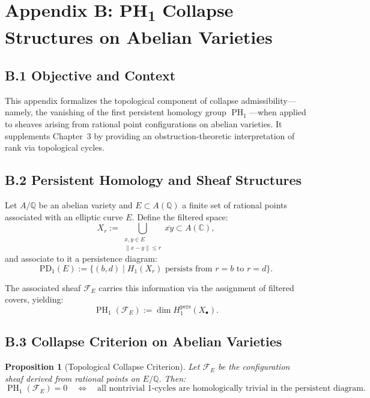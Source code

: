 \documentclass[11pt]{article}
\newtheorem{proposition}[theorem]{Proposition}
\DeclareMathOperator{\PH}{PH}
\begin{document}
\section*{Appendix B: PH\textsubscript{1} Collapse Structures on Abelian Varieties}

\subsection*{B.1 Objective and Context}

This appendix formalizes the topological component of collapse admissibility—namely, the vanishing of the first persistent homology group \( \PH_1 \)—when applied to sheaves arising from rational point configurations on abelian varieties. It supplements Chapter~3 by providing an obstruction-theoretic interpretation of rank via topological cycles.

\subsection*{B.2 Persistent Homology and Sheaf Structures}

Let \( A/\mathbb{Q} \) be an abelian variety and \( E \subset A(\mathbb{Q}) \) a finite set of rational points associated with an elliptic curve \( E \). Define the filtered space:
\[
X_r := \bigcup_{\substack{x,y \in E \\ \|x - y\| \leq r}} \overline{xy} \subset A(\mathbb{C}),
\]
and associate to it a persistence diagram:
\[
\mathrm{PD}_1(E) := \{ (b,d) \mid H_1(X_r) \text{ persists from } r = b \text{ to } r = d \}.
\]

The associated sheaf \( \mathcal{F}_E \) carries this information via the assignment of filtered covers, yielding:
\[
\PH_1(\mathcal{F}_E) := \dim H_1^{\mathrm{pers}}(X_\bullet).
\]

\subsection*{B.3 Collapse Criterion on Abelian Varieties}

\begin{proposition}[Topological Collapse Criterion]
\label{prop:ph1-collapse}
Let \( \mathcal{F}_E \) be the configuration sheaf derived from rational points on \( E/\mathbb{Q} \). Then:
\[
\PH_1(\mathcal{F}_E) = 0 \quad \Longleftrightarrow \quad \text{all nontrivial 1-cycles are homologically trivial in the persistent diagram}.
\]
\end{proposition}
\end{document}
